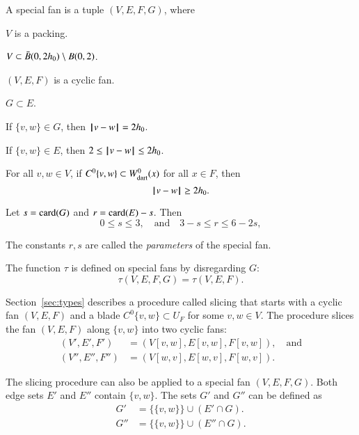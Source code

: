 \begin{definition}
A special fan is a tuple $(V,E,F,G)$, where
\begin{nomerate}
\item {} $V$ is a packing.
\item {} $V\subset \bar B(0,2{h_0}) \setminus B(0,2)$.
\item {} $(V,E,F)$ is a cyclic fan.
\item {} $G\subset E$.
\item {} If $\{v,w\}\in G$, then ${\hskip0.1em|\hskip-0.15em|\hskip0.1em}v - w{\hskip0.1em|\hskip-0.15em|\hskip0.1em}=2{h_0}$.
\item {} If $\{v,w\}\in E$, then $2\le {\hskip0.1em|\hskip-0.15em|\hskip0.1em}v - w{\hskip0.1em|\hskip-0.15em|\hskip0.1em}\le 2{h_0}$.
\item {} For all $v,w\in V$, if $C^0\{v,w\}\subset W^0_{\text{dart}}(x)$ for all $x\in F$, then 
   $${\hskip0.1em|\hskip-0.15em|\hskip0.1em}v - w{\hskip0.1em|\hskip-0.15em|\hskip0.1em}\ge 2{h_0}.$$
\item {} %
 Let      $s={\operatorname{card}}(G)$ and $r={\operatorname{card}}(E) - s$.  Then
$$0\le s \le 3,\quad\text{and}\quad3-s \le r \le 6 - 2s,$$
\end{nomerate}
The constants $r,s$ are called the {\it parameters} of the special fan.
\end{definition}

The function $\tau$ is defined on special fans by disregarding $G$:
$$
\tau(V,E,F,G) = \tau(V,E,F).
$$





Section~\ref{sec:types} describes a procedure called slicing that starts with a cyclic fan $(V,E,F)$
and a blade $C^0\{v,w\} \subset U_F$ for some $v,w\in V$.  The procedure slices the fan $(V,E,F)$ along $\{v,w\}$  into two cyclic fans:
$$
\begin{array}{lll}
(V',E',F')&=(V[v,w],E[v,w],F[v,w]),\quad\text{and}\\
 (V'',E'',F'')&= (V[w,v],E[w,v],F[w,v]).
\end{array}
$$


The slicing procedure can also be applied to a special fan $(V,E,F,G)$.
Both edge sets $E'$ and $E''$ contain $\{v,w\}$.  The sets $G'$ and $G''$ can be defined
as 
$$
\begin{array}{lll}
G' &= \{\{v,w\}\} \cup (E'\cap G).\\
G'' &= \{\{v,w\}\} \cup (E''\cap G).\\
\end{array}
$$ 

